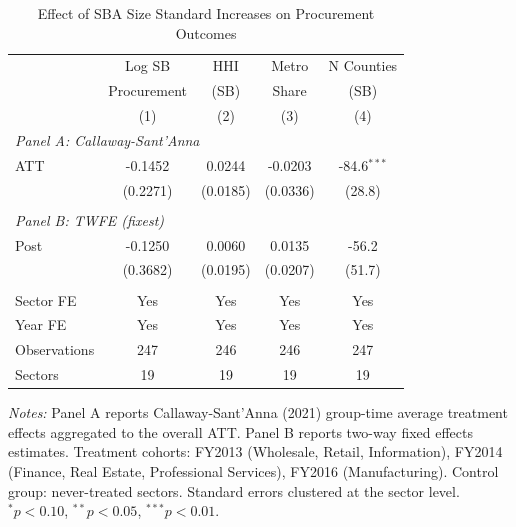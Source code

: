 \begin{table}[htbp]
\centering
\begin{threeparttable}
\caption{Effect of SBA Size Standard Increases on Procurement Outcomes}
\label{tab:main}
\begin{tabular}{lcccc}
\toprule
 & Log SB & HHI & Metro & N Counties \\
 & Procurement & (SB) & Share & (SB) \\
 & (1) & (2) & (3) & (4) \\
\midrule
\multicolumn{5}{l}{\textit{Panel A: Callaway-Sant'Anna}} \\
ATT & -0.1452 & 0.0244 & -0.0203 & -84.6$^{***}$ \\
 & (0.2271) & (0.0185) & (0.0336) & (28.8) \\
 & & & & \\
\multicolumn{5}{l}{\textit{Panel B: TWFE (fixest)}} \\
Post & -0.1250 & 0.0060 & 0.0135 & -56.2 \\
 & (0.3682) & (0.0195) & (0.0207) & (51.7) \\
 & & & & \\
Sector FE & Yes & Yes & Yes & Yes \\
Year FE & Yes & Yes & Yes & Yes \\
Observations & 247 & 246 & 246 & 247 \\
Sectors & 19 & 19 & 19 & 19 \\
\bottomrule
\end{tabular}
\begin{tablenotes}
\item \textit{Notes:} Panel A reports Callaway-Sant'Anna (2021) group-time average treatment effects aggregated to the overall ATT. Panel B reports two-way fixed effects estimates. Treatment cohorts: FY2013 (Wholesale, Retail, Information), FY2014 (Finance, Real Estate, Professional Services), FY2016 (Manufacturing). Control group: never-treated sectors. Standard errors clustered at the sector level. $^{*}p<0.10$, $^{**}p<0.05$, $^{***}p<0.01$.
\end{tablenotes}
\end{threeparttable}
\end{table}
